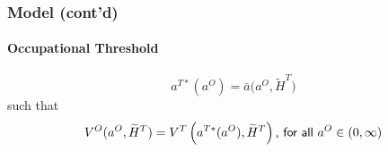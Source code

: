 \documentclass[11pt]{beamer}
\begin{document}
\begin{frame}
\frametitle{Model (cont'd)}
\framesubtitle{Occupational Threshold}
\begin{equation*}
a^{T*}(a^O) = \bar{a}\big(a^{O},\widetilde{H}^T\big) %
\end{equation*}
such that
\begin{equation*}
V^{O}(a^{O},\widetilde{H}^T) = V^{T}\left(a^{T*}(a^O),\widetilde{H}^T\right) \textrm{{\sf , for all} } a^O \in (0,\infty)
\end{equation*}

\end{frame}
\end{document}
